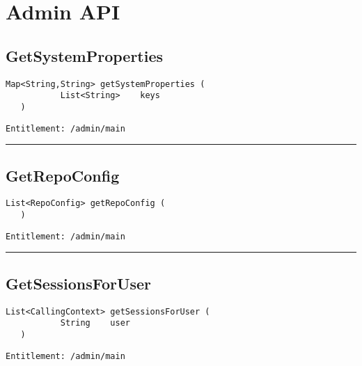 \chapter{Admin API}

\section{GetSystemProperties}
\label{Api:GetSystemProperties}
\begin{lstlisting}[style=nonumbers]
   Map<String,String> getSystemProperties (
           List<String>    keys
   )
\end{lstlisting}
\begin{Verbatim}[formatcom=\color{Maroon}]
  Entitlement: /admin/main
\end{Verbatim}



\rule{12cm}{2pt}
\section{GetRepoConfig}
\label{Api:GetRepoConfig}
\begin{lstlisting}[style=nonumbers]
   List<RepoConfig> getRepoConfig (
   )
\end{lstlisting}
\begin{Verbatim}[formatcom=\color{Maroon}]
  Entitlement: /admin/main
\end{Verbatim}



\rule{12cm}{2pt}
\section{GetSessionsForUser}
\label{Api:GetSessionsForUser}
\begin{lstlisting}[style=nonumbers]
   List<CallingContext> getSessionsForUser (
           String    user
   )
\end{lstlisting}
\begin{Verbatim}[formatcom=\color{Maroon}]
  Entitlement: /admin/main
\end{Verbatim}



